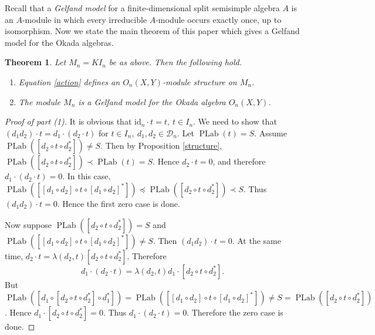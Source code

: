 \documentclass[12pt,reqno]{amsart}
\numberwithin{equation}{section}
\newtheorem{theorem}{Theorem}[section]
\theoremstyle{definition}
\theoremstyle{definition}
\newcommand{\PLab}{\operatorname{PLab}}
\begin{document}
Recall that a \emph{Gelfand model} for a finite-dimensional split semisimple algebra $A$ is an $A$-module in which every irreducible $A$-module occurs exactly once, up to isomorphism. Now we state the main theorem of this paper which gives a Gelfand model for the Okada algebras.
\begin{theorem}\label{main}
Let $M_n=KI_n$ be as above. Then the following hold.
\begin{enumerate}
\item Equation \eqref{action} defines an $O_n(X,Y)$-module structure on $M_n$.
\item The module $M_n$ is a Gelfand model for the Okada algebra $O_n(X,Y)$.
\end{enumerate}
\end{theorem}
\begin{proof}[Proof of part (1)]
 It is obvious that $\mathrm{id}_n \cdot t=t,~ t \in I_n.$
    We need to show that $(d_1d_2)\cdot t=d_1\cdot(d_2\cdot t)$ for $t \in I_n,~ d_1,d_2 \in \mathcal{D}_n.$ Let $\PLab(t)=S$. Assume $\PLab([d_2\circ t\circ d_2^*])\neq S$. Then by Proposition \ref{structure}, $\PLab([d_2\circ t\circ d_2^*])\prec \PLab(t)=S$. Hence $d_2\cdot t=0$, and therefore $d_1\cdot(d_2\cdot t)=0$.
In this case, $\PLab([[d_1\circ d_2]\circ t\circ [d_1\circ d_2]^*])\preccurlyeq \PLab([d_2\circ t\circ d_2^*])\prec S$. Thus $(d_1d_2)\cdot t=0$. Hence the first zero case is done.


Now suppose $\PLab([d_2\circ t\circ d_2^*])=S$ and $\PLab([[d_1\circ d_2]\circ t\circ [d_1\circ d_2]^*])\neq S$. Then $(d_1d_2)\cdot t=0$.
At the same time, $d_2\cdot t=\lambda(d_2,t)[d_2\circ t\circ d_2^*]$. Therefore
\[
d_1\cdot(d_2\cdot t)
=
\lambda(d_2,t)
d_1\cdot [d_2\circ t\circ d_2^*].
\]
But $\PLab([d_1\circ [d_2\circ t\circ d_2^*]\circ d_1^*])=\PLab([[d_1\circ d_2]\circ t\circ [d_1\circ d_2]^*])\neq S=\PLab([d_2\circ t\circ d_2^*])$. Hence $d_1\cdot [d_2\circ t\circ d_2^*]=0$. Thus $d_1\cdot(d_2\cdot t)=0$.
Therefore the zero case is done.



\end{proof}
\end{document}
